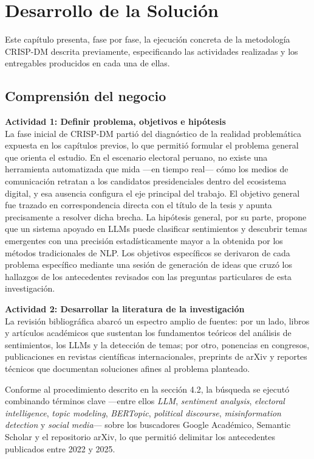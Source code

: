 \chapter{Desarrollo de la Solución}

Este capítulo presenta, fase por fase, la ejecución concreta de la metodología
CRISP-DM descrita previamente, especificando las actividades realizadas y los
entregables producidos en cada una de ellas.

\section{Comprensión del negocio}

\textbf{Actividad 1: Definir problema, objetivos e hipótesis}
\\
La fase inicial de CRISP-DM partió del diagnóstico de la realidad problemática
expuesta en los capítulos previos, lo que permitió formular el problema general que
orienta el estudio. En el escenario electoral peruano, no existe una herramienta
automatizada que mida —en tiempo real— cómo los medios de comunicación retratan a
los candidatos presidenciales dentro del ecosistema digital, y esa ausencia configura
el eje principal del trabajo. El objetivo general fue trazado en correspondencia
directa con el título de la tesis y apunta precisamente a resolver dicha brecha. La
hipótesis general, por su parte, propone que un sistema apoyado en LLMs puede
clasificar sentimientos y descubrir temas emergentes con una precisión
estadísticamente mayor a la obtenida por los métodos tradicionales de NLP. Los
objetivos específicos se derivaron de cada problema específico mediante una sesión
de generación de ideas que cruzó los hallazgos de los antecedentes revisados con
las preguntas particulares de esta investigación.

\textbf{Actividad 2: Desarrollar la literatura de la investigación}
\\
La revisión bibliográfica abarcó un espectro amplio de fuentes: por un lado, libros
y artículos académicos que sustentan los fundamentos teóricos del análisis de
sentimientos, los LLMs y la detección de temas; por otro, ponencias en congresos,
publicaciones en revistas científicas internacionales, preprints de arXiv y reportes
técnicos que documentan soluciones afines al problema planteado.

Conforme al procedimiento descrito en la sección 4.2, la búsqueda se ejecutó
combinando términos clave —entre ellos \textit{LLM}, \textit{sentiment analysis},
\textit{electoral intelligence}, \textit{topic modeling}, \textit{BERTopic},
\textit{political discourse}, \textit{misinformation detection} y
\textit{social media}— sobre los buscadores Google Académico, Semantic Scholar y el
repositorio arXiv, lo que permitió delimitar los antecedentes publicados entre 2022
y 2025.

